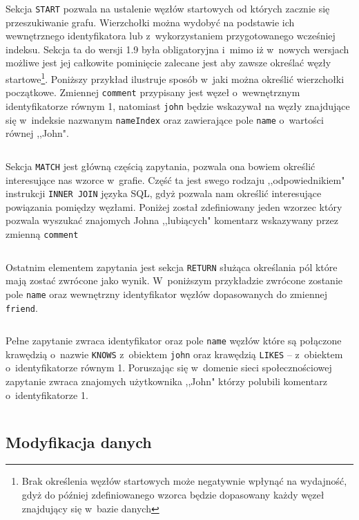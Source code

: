 \documentclass[brudnopis]{xmgr}
\begin{document}
Sekcja \texttt{START} pozwala na ustalenie węzłów startowych od których zacznie się przeszukiwanie grafu. Wierzchołki można wydobyć na podstawie ich wewnętrznego identyfikatora lub z~wykorzystaniem przygotowanego wcześniej indeksu. Sekcja ta do wersji 1.9 była obligatoryjna i~mimo iż w~nowych wersjach możliwe jest jej całkowite pominięcie zalecane jest aby zawsze określać węzły startowe\footnote{Brak określenia węzłów startowych może negatywnie wpłynąć na wydajność, gdyż do później zdefiniowanego wzorca będzie dopasowany każdy węzeł znajdujący się w~bazie danych}. Poniższy przykład ilustruje sposób w~jaki można określić wierzchołki początkowe. Zmiennej \texttt{comment} przypisany jest węzeł o~wewnętrznym identyfikatorze równym 1, natomiast \texttt{john} będzie wskazywał na węzły znajdujące się w~indeksie nazwanym \texttt{nameIndex} oraz zawierające pole \texttt{name} o~wartości równej ,,John".

\inputminted{cypher}{listings/cypher/start-section.cypher}

Sekcja \texttt{MATCH} jest główną częścią zapytania, pozwala ona bowiem określić interesujące nas wzorce w~grafie. Część ta jest swego rodzaju ,,odpowiednikiem" instrukcji \texttt{INNER JOIN} języka SQL, gdyż pozwala nam określić interesujące powiązania pomiędzy węzłami. Poniżej został zdefiniowany jeden wzorzec który pozwala wyszukać znajomych Johna ,,lubiących" komentarz wskazywany przez zmienną \texttt{comment}

\inputminted{cypher}{listings/cypher/match-section.cypher}

Ostatnim elementem zapytania jest sekcja \texttt{RETURN} służąca określania pól które mają zostać zwrócone jako wynik. W~poniższym przykładzie zwrócone zostanie pole \texttt{name} oraz wewnętrzny identyfikator węzłów dopasowanych do zmiennej \texttt{friend}.

\inputminted{cypher}{listings/cypher/return-section.cypher}

Pełne zapytanie zwraca identyfikator oraz pole \texttt{name} węzłów które są połączone krawędzią o~nazwie \texttt{KNOWS} z~obiektem \texttt{john} oraz krawędzią \texttt{LIKES} -- z~obiektem o~identyfikatorze równym {1}. Poruszając się w~domenie sieci społecznościowej zapytanie zwraca znajomych użytkownika ,,John" którzy polubili komentarz o~identyfikatorze {1}.

\inputminted{cypher}{listings/cypher/sample-query.cypher}

\subsection{Modyfikacja danych}
\end{document}
